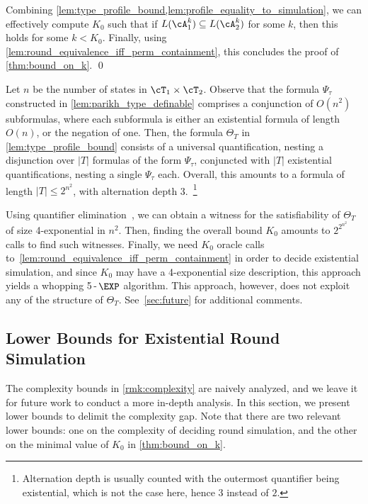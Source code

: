 Combining \cref{lem:type_profile_bound,lem:profile_equality_to_simulation}, we can effectively compute $K_0$ such that if $L(\cA^k_1)\subseteq L(\cA^k_2)$ for some $k$, then this holds for some $k<K_0$. Finally, using \cref{lem:round_equivalence_iff_perm_containment}, this concludes the proof of \cref{thm:bound_on_k}. \qed

\begin{remark}
\label{rmk:complexity}
Let $n$ be the number of states in $\cT_1\times \cT_2$. Observe that the formula $\Psi_\tau$ constructed in \cref{lem:parikh_type_definable} comprises a conjunction of $O(n^2)$ \PA subformulas, where each subformula is either an existential \PA formula of length $O(n)$, or the negation of one. Then, the formula $\Theta_T$ in \cref{lem:type_profile_bound} consists of a universal quantification, nesting a disjunction over $|T|$ formulas of the form $\Psi_\tau$, conjuncted with $|T|$ existential quantifications, nesting a single $\Psi_\tau$ each.
Overall, this amounts to a formula of length $|T|\le 2^{n^2}$, with alternation depth 3.~\footnote{Alternation depth is usually counted with the outermost quantifier being existential, which is not the case here, hence $3$ instead of $2$.}

Using quantifier elimination~\cite{Cooper1972,Oppen1978}, we can obtain a witness for the satisfiability of $\Theta_T$ of size 4-exponential in $n^2$. Then, finding the overall bound $K_0$ amounts to $2^{2^{n^2}}$ calls to find such witnesses. Finally, we need $K_0$ oracle calls to~\cref{lem:round_equivalence_iff_perm_containment} in order to decide existential simulation, and since $K_0$ may have a 4-exponential size description, this approach yields a whopping 5\,-\,$\EXP$ algorithm. 
This approach, however, does not exploit any of the structure of $\Theta_T$. See~\cref{sec:future} for additional comments.
\end{remark}

\subsection{Lower Bounds for Existential Round Simulation}
\label{sec:lower_bounds_existential}
The complexity bounds in \cref{rmk:complexity} are naively analyzed, and we leave it for future work to conduct a more in-depth analysis. In this section, we present lower bounds to delimit the complexity gap. Note that there are two relevant lower bounds: one on the complexity of deciding round simulation, and the other on the minimal value of $K_0$ in \cref{thm:bound_on_k}.

